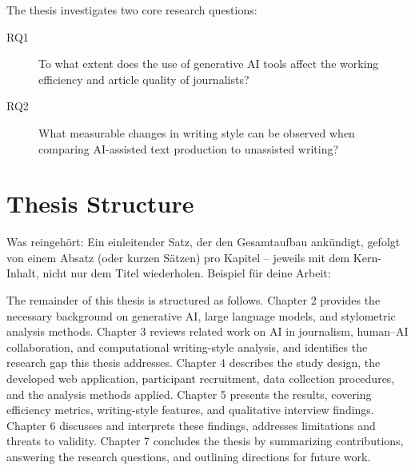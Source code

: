 The thesis investigates two core research questions:

\begin{description}
  \item[RQ1] To what extent does the use of generative AI tools affect the
    working efficiency and article quality of journalists?
  \item[RQ2] What measurable changes in writing style can be observed when
    comparing AI-assisted text production to unassisted writing?
\end{description}

\section{Thesis Structure}
Was reingehört:
Ein einleitender Satz, der den Gesamtaufbau ankündigt, gefolgt von einem Absatz (oder kurzen Sätzen) pro Kapitel – jeweils mit dem Kern-Inhalt, nicht nur dem Titel wiederholen.
Beispiel für deine Arbeit:

The remainder of this thesis is structured as follows. Chapter 2 provides the necessary background on generative AI, large language models, and stylometric analysis methods. Chapter 3 reviews related work on AI in journalism, human–AI collaboration, and computational writing-style analysis, and identifies the research gap this thesis addresses. Chapter 4 describes the study design, the developed web application, participant recruitment, data collection procedures, and the analysis methods applied. Chapter 5 presents the results, covering efficiency metrics, writing-style features, and qualitative interview findings. Chapter 6 discusses and interprets these findings, addresses limitations and threats to validity. Chapter 7 concludes the thesis by summarizing contributions, answering the research questions, and outlining directions for future work.